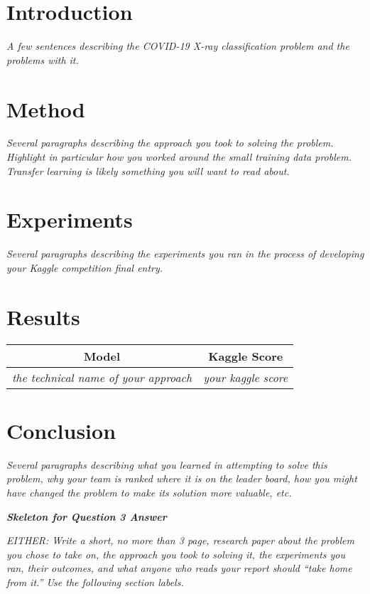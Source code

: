 \documentclass{article}
\begin{document}
\section{Introduction}
\emph{A few sentences describing the COVID-19 X-ray classification problem and the problems with it.}
\section{Method}
\emph{Several paragraphs describing the approach you took to solving the problem.  Highlight in particular how you worked around the small training
data problem.  Transfer learning is likely something you will want to read
about.}
\section{Experiments}
\emph{Several paragraphs describing the experiments you ran in the process of developing your Kaggle competition final entry.}
\section{Results}

\begin{center}
 \begin{tabular}{|c | c |} 
 \hline
 Model & Kaggle Score  \\ [0.5ex]
 \hline\hline
 \emph{the technical name of your approach} & \emph{your kaggle score} \\
 \hline
\end{tabular}
\end{center}

\section{Conclusion}
\emph{Several paragraphs describing what you learned in attempting to solve this problem, why your team is ranked where it is on the leader board, how you might have changed the problem to make its solution more valuable, etc.}
\newpage

{\em \bf Skeleton for Question 3 Answer}
\setcounter{section}{0}

\emph{EITHER: Write a short, no more than 3 page, research paper about the problem you chose
to take on, the approach you took to solving it, the experiments you ran,
their outcomes, and what anyone who reads your report should ``take home from it.''  Use the following section labels.}
\end{document}
